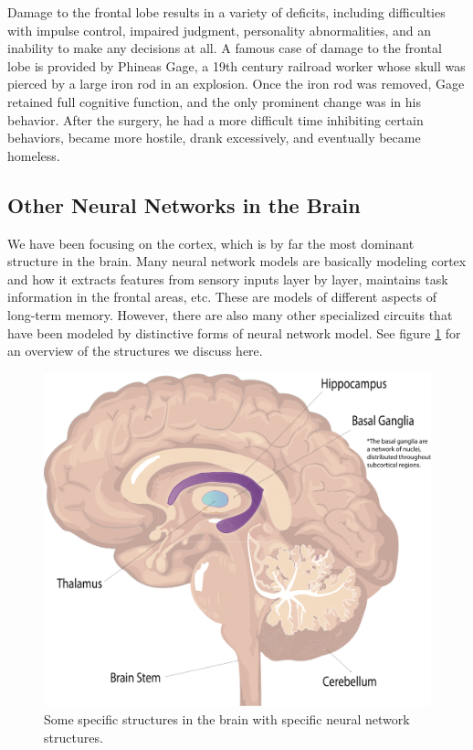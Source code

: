 Damage to the frontal lobe results in a variety of deficits, including difficulties with impulse control, impaired judgment, personality abnormalities, and an inability to make any decisions at all. A famous case of damage to the frontal lobe is provided by Phineas Gage, a 19th century railroad worker whose skull was pierced by a large iron rod in an explosion. Once the iron rod was removed, Gage retained full cognitive function, and the only prominent change was in his behavior. After the surgery, he had a more difficult time inhibiting certain behaviors, became more hostile, drank excessively, and eventually became homeless.

\subsection{Other Neural Networks in the Brain }

We have been focusing on the cortex, which is by far the most dominant structure in the brain. Many neural network models are basically modeling cortex and how it extracts features from sensory inputs layer by layer, maintains task information in the frontal areas, etc. These are models of different aspects of long-term memory. However, there are also many other specialized circuits that have been modeled by distinctive forms of neural network model. See figure \ref{brain_internal} for an overview of the structures we discuss here.

\begin{figure}[h]
\centering
\includegraphics[width=.5\textwidth]{./images/brain_internal.png}
\caption[Pamela Payne.]{Some specific structures in the brain with specific neural network structures.}
\label{brain_internal}
\end{figure}

